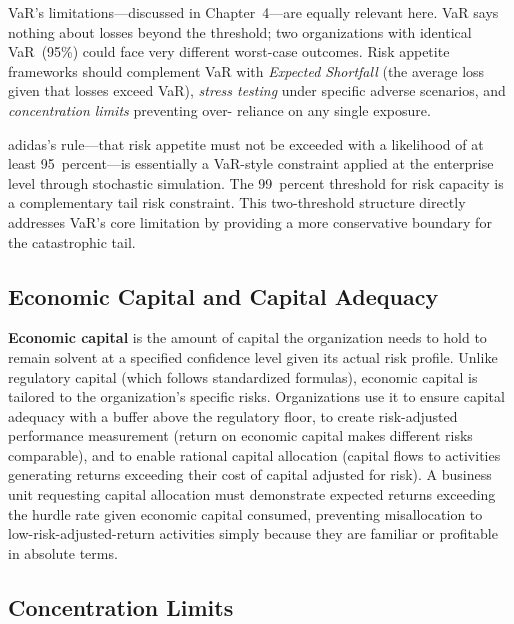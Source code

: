 \documentclass[11pt,openany]{book}
\begin{document}
VaR's limitations---discussed in Chapter~4---are equally relevant here.
VaR says nothing about losses beyond the threshold; two organizations with
identical VaR~(95\%) could face very different worst-case outcomes.
Risk appetite frameworks should complement VaR with \emph{Expected Shortfall}
(the average loss given that losses exceed VaR), \emph{stress testing} under
specific adverse scenarios, and \emph{concentration limits} preventing over-
reliance on any single exposure.

adidas's rule---that risk appetite must not be exceeded with a likelihood of at
least 95~percent---is essentially a VaR-style constraint applied at the
enterprise level through stochastic simulation. The 99~percent threshold for
risk capacity is a complementary tail risk constraint. This two-threshold
structure directly addresses VaR's core limitation by providing a more
conservative boundary for the catastrophic tail.

\subsection{Economic Capital and Capital Adequacy}
\label{subsec:economic-capital}

\textbf{Economic capital} is the amount of capital the organization needs to
hold to remain solvent at a specified confidence level given its actual risk
profile. Unlike regulatory capital (which follows standardized formulas),
economic capital is tailored to the organization's specific risks. Organizations
use it to ensure capital adequacy with a buffer above the regulatory floor, to
create risk-adjusted performance measurement (return on economic capital makes
different risks comparable), and to enable rational capital allocation (capital
flows to activities generating returns exceeding their cost of capital adjusted
for risk). A business unit requesting capital allocation must demonstrate
expected returns exceeding the hurdle rate given economic capital consumed,
preventing misallocation to low-risk-adjusted-return activities simply because
they are familiar or profitable in absolute terms.

\subsection{Concentration Limits}
\label{subsec:concentration-limits}
\end{document}
